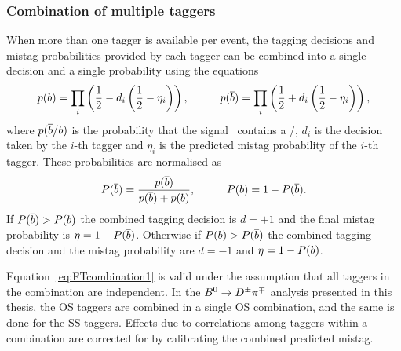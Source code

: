 \subsubsection{Combination of multiple taggers}
\label{sec:tagging:combination}

When more than one tagger is available per event, the tagging
decisions and mistag probabilities provided by each tagger can be combined into a single decision and a
single probability using the equations
\begin{equation}
	p(b) = \prod_i\left(\frac{1}{2}-d_i\left(\frac{1}{2}-\eta_i\right)\right),\hspace{1cm}
	p(\overline {b}) = \prod_i\left(\frac{1}{2}+d_i\left(\frac{1}{2}-\eta_i\right)\right), \label{eq:FTcombination1}
\end{equation}
where $p(\overline {b}/b)$ is the probability that the signal \Bz~contains a \bquarkbar/\bquark,
$d_i$ is the decision taken by the $i$-th tagger and
$\eta_i$ is the predicted mistag probability of the $i$-th tagger. These probabilities are
normalised as
\begin{equation}
	P(\overline {b}) = \frac{p(\overline {b})}{p(\overline {b})+p(b)}, \hspace{1cm} P(b) = 1 - P(\overline {b}). \label{eq:FTcombination2}
\end{equation}
If $P(\overline {b})>P(b)$ the combined tagging decision is $d=+1$ and the final mistag probability is
$\eta = 1-P(\overline {b})$. Otherwise if $P(b)>P(\overline {b})$ the combined tagging decision and the mistag
probability are $d=-1$ and $\eta=1-P(b)$. 

Equation~\ref{eq:FTcombination1} is valid under the assumption that all taggers in the combination are independent.
In the $B^0\rightarrow D^\pm\pi^\mp$ analysis presented in this thesis, the OS taggers are combined in a single OS combination, and
the same is done for the SS taggers. Effects due to correlations among taggers within a combination are corrected for by calibrating
the combined predicted mistag.


